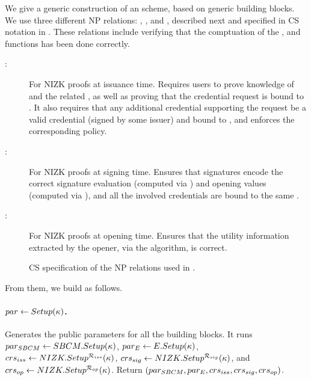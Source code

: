 We give a generic construction of an \UAS scheme, based on
generic building blocks. We use three different NP relations: \RelIss, \RelSig,
and \RelIns, described next and specified in CS notation \cite{cs97} in
. These relations include verifying that the comptuation of
the \fissue, \feval and \finsp functions has been done correctly.

\begin{description}
\item[\RelIss:] For NIZK proofs at issuance time. Requires users to
  prove knowledge of \usk and the related \upk, as well as proving that the
  credential request is bound to \usk. It also requires that any additional
  credential supporting the request be a valid credential (signed by some
  issuer) and bound to \upk, and enforces the corresponding \fissue policy.
\item[\RelSig:] For NIZK proofs at signing time. Ensures that
  signatures encode the correct signature evaluation (computed via \feval)
  and opening values (computed via \finsp), and all the involved
  credentials are bound to the same \upk.
\item[\RelIns:] For NIZK proofs at opening time. Ensures that the
  utility information extracted by the opener, via the \Open algorithm, is
  correct.
\end{description}

\begin{figure}[ht!]
  \centering
  \scalebox{0.85}{
    
  }
  \caption{CS specification of the NP relations used in \CUASGen.
  }
  \label{fig:nizkrels}
\end{figure}

From them, we build \CUASGen as follows.

\paragraph{$par \gets Setup(\kappa)$.} %
Generates the public parameters for all the building blocks. It runs
$par_{SBCM} \gets SBCM.Setup(\kappa)$, $par_{E} \gets E.Setup(\kappa)$,
$crs_{iss} \gets NIZK.Setup^{\mathcal{R}_{iss}}(\kappa)$,
$crs_{sig} \gets NIZK.Setup^{\mathcal{R}_{sig}}(\kappa)$, and
$crs_{op} \gets NIZK.Setup^{\mathcal{R}_{op}}(\kappa)$. Return
$(par_{SBCM},par_{E},crs_{iss},crs_{sig},crs_{op})$.


